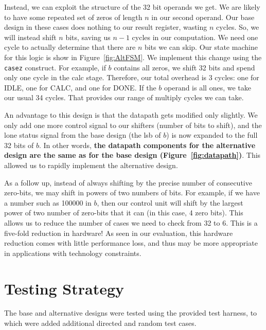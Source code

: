 \documentclass[10pt]{article}
\begin{document}
Instead, we can exploit the structure of the 32 bit operands we get.
We are likely to have some repeated set of zeros of length $n$ in our second operand.
Our base design in these cases does nothing to our result register, wasting $n$ cycles.
So, we will instead shift $n$ bits, saving us $n-1$ cycles in our computation.
We need one cycle to actually determine that there are $n$ bits we can skip.
Our state machine for this logic is show in Figure~\ref{fig:AltFSM}.
We implement this change using the \verb+casez+ construct.
For example, if $b$ contains all zeros, we shift 32 bits and spend only one cycle in the calc stage.
Therefore, our total overhead is 3 cycles: one for IDLE, one for CALC, and one for DONE.
If the $b$ operand is all ones, we take our usual 34 cycles.
That provides our range of multiply cycles we can take.

An advantage to this design is that the datapath gets modified only slightly.
We only add one more control signal to our shifters (number of bits to shift), and the lone status signal from the base design (the lsb of $b$) is now expanded to the full 32 bits of $b$.
In other words, \textbf{the datapath components for the alternative design are the same as for the base design (Figure~\ref{fig:datapath})}. 
This allowed us to rapidly implement the alternative design.

As a follow up, instead of always shifting by the precise number of consecutive zero-bits, we may shift in powers of two numbers of bits. For example, if we have a number such as 100000 in $b$, then our control unit will shift by the largest power of two number of zero-bits that it can (in this case, 4 zero bits).
This allows us to reduce the number of cases we need to check from 32 to 6.
This is a five-fold reduction in hardware! As seen in our evaluation, this hardware reduction comes with little performance loss, and thus may be more appropriate in applications with technology constraints.


\section{Testing Strategy}

The base and alternative designs were tested using the provided test harness, to which were added additional directed and random test cases.
\end{document}

